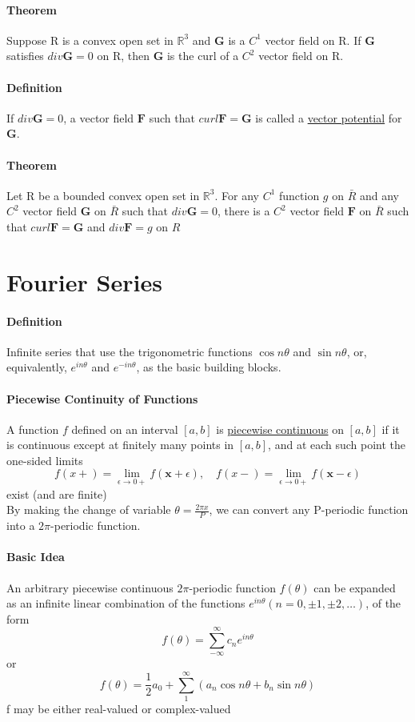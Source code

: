 \documentclass[11pt]{article}
\newcommand{\tb}[1]{\textbf{#1}}
\newcommand{\real}[0]{\mathbb{R}}
\newcommand{\under}[1]{\underline{#1}}
\newcommand{\vx}[0]{\tb{x}}
\newcommand{\vf}[0]{\tb{F}}
\newcommand{\vg}[0]{\tb{G}}
\begin{document}
\paragraph{Theorem} Suppose R is a convex open set in $\real^3$ and $\vg$ is a $C^1$ vector field on R. If $\vg$ satisfies $div \vg = 0$ on R, then $\vg$ is the curl of a $C^2$ vector field on R.
\paragraph{Definition} If $div \vg = 0$, a vector field $\vf$ such that $curl \vf = \vg$ is called a \under{vector potential} for $\vg$.
\paragraph{Theorem} Let R be a bounded convex open set in $\real^3$. For any $C^1$ function $g$ on $\bar{R}$ and any $C^2$ vector field $\vg$ on $\bar{R}$ such that $div \vg = 0$, there is a $C^2$ vector field $\vf$ on $\bar{R}$ such that $curl \vf = \vg$ and $div \vf = g$ on $R$
\section{Fourier Series}
\paragraph{Definition} Infinite series that use the trigonometric functions $\cos n\theta$ and $\sin n\theta$, or, equivalently, $e^{in\theta}$ and $e^{-in\theta}$, as the basic building blocks.
\paragraph{Piecewise Continuity of Functions} A function $f$ defined on an interval $[a,b]$ is \under{piecewise continuous} on $[a,b]$ if it is continuous except at finitely many points in $[a,b]$, and at each such point the one-sided limits
$$f(x+) = \underset{\epsilon \rightarrow 0+}{\lim} f(\vx + \epsilon), \quad f(x-)=\underset{\epsilon \rightarrow 0+}{\lim} f(\vx - \epsilon)$$
exist (and are finite)\\
By making the change of variable $\theta = \frac{2\pi x}{P}$, we can convert any P-periodic function into a $2\pi$-periodic function. 
\paragraph{Basic Idea} An arbitrary piecewise continuous $2\pi$-periodic function $f(\theta)$ can be expanded as an infinite linear combination of the functions $e^{in\theta}(n = 0,\pm 1, \pm 2,\hdots)$, of the form
$$f(\theta) = \sum_{-\infty}^{\infty}c_ne^{in\theta}$$
or
$$f(\theta) = \frac{1}{2}a_0 + \sum_1^\infty(a_n\cos n\theta+b_n \sin n\theta)$$
f may be either real-valued or complex-valued
\end{document}
